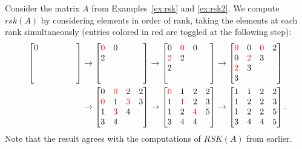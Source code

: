 \documentclass[ALCO,Unicode,published]{cedram}
\numberwithin{equation}{section}
\newcommand{\red}[1]{\textcolor{red}{#1}}
\begin{document}
\begin{Ex}
Consider the matrix $A$ from Examples~\ref{ex:rsk} and \ref{ex:rsk2}. We compute $rsk(A)$ by considering elements in order of rank, taking the elements at each rank simultaneously (entries colored in red are toggled at the following step):
\begin{align*}
    \begin{bmatrix}
    0&&&\\&\phantom0\\&&\phantom0\\&&&\phantom0
\end{bmatrix} &\to 
\begin{bmatrix}
    \red{0}&0&&\\
    2\\
    &&\phantom0\\
    &&&\phantom0
\end{bmatrix} \to
\begin{bmatrix}
    0&\red0&0&\\
    \red2&2\\
    2\\
    &&&\phantom0
\end{bmatrix} \to
\begin{bmatrix}
    \red0&0&\red0&2\\
    0&\red2&3\\
    \red2&3\\
    3
\end{bmatrix}\\
&\to
\begin{bmatrix}
    0&\red0&2&2\\
    \red0&1&\red3&3\\
    1&\red3&4\\
    3&4
\end{bmatrix}
\to
\begin{bmatrix}
    \red0&1&2&2\\
    1&\red1&2&3\\
    1&2&\red4&5\\
    3&4&4
\end{bmatrix}
\to
\begin{bmatrix}
    1&1&2&2\\
    1&2&2&3\\
    1&2&2&5\\
    3&4&4&5
\end{bmatrix}.
\end{align*}
Note that the result agrees with the computations of $RSK(A)$ from earlier.
\end{Ex}
\end{document}
